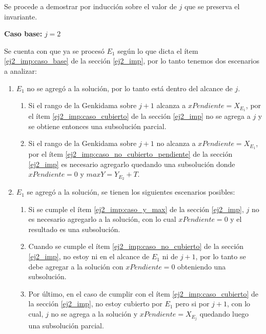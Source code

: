 \begin{enumerate}
{			Se procede a demostrar por inducción sobre el valor de $j$ que se preserva
			el invariante.

			\textbf{Caso base:} $j = 2$

			Se cuenta con que ya se procesó $E_1$ según lo que dicta el
			ítem \ref{ej2_imp:caso_base} de la sección \ref{ej2_imp}, por lo
			tanto tenemos dos escenarios a analizar:

			\begin{enumerate}
				\item{
					$E_1$ no se agregó a la solución, por lo tanto está dentro
					del alcance de $j$.
					\begin{enumerate}
						\item{
							Si el rango de la Genkidama sobre $j + 1$ alcanza a
							$xPendiente = X_{E_1}$, por el ítem
							\ref{ej2_imp:caso_cubierto} de la sección \ref{ej2_imp}
							no se agrega a $j$ y se obtiene entonces una subsolución
							parcial.
						}
						\item{
							Si el rango de la Genkidama sobre $j + 1$ no alcanza a
							$xPendiente = X_{E_1}$, por el ítem
							\ref{ej2_imp:caso_no_cubierto_pendiente} de la sección
							\ref{ej2_imp} es necesario agregarlo quedando una
							subsolución donde $xPendiente = 0$ y $maxY = Y_{E_2} + T$.
						}
					\end{enumerate}
				}
				\item{
					$E_1$ se agregó a la solución, se tienen los siguientes escenarios
					posibles:
					\begin{enumerate}
						\item{
							Si se cumple el ítem \ref{ej2_imp:caso_y_max} de la
							sección \ref{ej2_imp}, $j$ no es necesario agregarlo
							a la solución, con lo cual $xPendiente = 0$ y
							el resultado es una subsolución.
						}
						\item{
							Cuando se cumple el ítem
							\ref{ej2_imp:caso_no_cubierto} de la sección
							\ref{ej2_imp}, no estoy ni en el alcance de $E_1$ ni
							de $j + 1$, por lo tanto se debe agregar a la
							solución con $xPendiente = 0$ obteniendo una
							subsolución.
						}
						\item{
							Por último, en el caso de cumplir con el ítem
							\ref{ej2_imp:caso_cubierto} de la sección
							\ref{ej2_imp}, no estoy cubierto por $E_1$ pero si
							por $j + 1$, con lo cual, $j$ no se agrega a la
							solución y $xPendiente = X_{E_j}$ quedando luego
							una subsolución parcial.
						}
					\end{enumerate}
				}
			\end{enumerate}

}
\end{enumerate}
